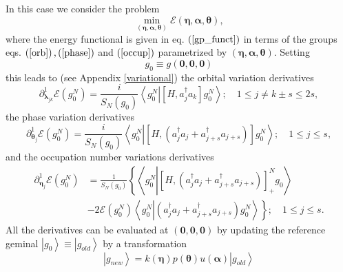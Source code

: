 \documentclass[titlepage]{article}%
\begin{document}
In this case we consider the problem
\begin{equation}
\min_{\left(  \bm{\eta,\alpha,\theta}\right)  }\mathcal{E}\left(
\bm{\eta,\alpha,\theta}\right)  ,
\end{equation}
where the energy functional is given in eq. $\left(  \ref{gp_funct}\right)  $
in terms of the groups eqs. $\left(  \ref{orb}\right)  ,\left(  \ref{phase}%
\right)  $ and $\left(  \ref{occup}\right)  $ parametrized by $\left(
\bm{\eta,\alpha,\theta}\right)  $. Setting
\begin{equation}
g_{0}\equiv g\left(  \bm{0,0,0}\right)
\end{equation}
this leads to (see Appendix \ref{variational}) the orbital variation
derivatives
\begin{equation}
\partial_{\bm{\lambda}_{jk}}^{1}\mathcal{E}\left(  g_{0}^{N}\right)  =\frac
{i}{S_{N}\left(  g_{0}\right)  }\left\langle g_{0}^{N}\left\vert \left[
H,a_{j}^{\dagger}a_{k}\right]  g_{0}^{N}\right.  \right\rangle ;\quad1\leq
j\neq k\pm s\leq2s,
\end{equation}
the phase variation derivatives
\begin{equation}
\partial_{\bm{\theta}_{j}}^{1}\mathcal{E}\left(  g_{0}^{N}\right)  =\frac
{i}{S_{N}\left(  g_{0}\right)  }\left\langle g_{0}^{N}\left\vert \left[
H,\left(  a_{j}^{\dagger}a_{j}+a_{j+s}^{\dagger}a_{j+s}\right)  \right]
g_{0}^{N}\right.  \right\rangle ;\quad1\leq j\leq s,
\end{equation}
and the occupation number variations derivatives
\begin{align}
\partial_{\bm{\eta}_{j}}^{1}\mathcal{E}\left(  g_{0}^{N}\right)   &  =\frac
{1}{S_{N}\left(  g_{0}\right)  }\left\{  \left\langle g_{0}^{N}\left\vert
\left[  H,\left(  a_{j}^{\dagger}a_{j}+a_{j+s}^{\dagger}a_{j+s}\right)
\right]  _{+}^{N}g_{0}\right.  \right\rangle \right. \nonumber\\
&  -\left.  2\mathcal{E}\left(  g_{0}^{N}\right)  \left\langle g_{0}%
^{N}\left\vert \left(  a_{j}^{\dagger}a_{j}+a_{j+s}^{\dagger}a_{j+s}\right)
g_{0}^{N}\right.  \right\rangle \right\}  ;\quad1\leq j\leq s.
\end{align}
All the derivatives can be evaluated at $\left(  \bm{0},\bm{0},\bm{0}\right)
$ by updating the reference geminal $\left\vert g_{0}\right\rangle
\equiv\left\vert g_{old}\right\rangle $ by a transformation
\begin{equation}
\left\vert g_{new}\right\rangle =k\left(  \bm{\eta}\right)  p\left(
\bm{\theta}\right)  u\left(  \bm{\alpha}\right)  \left\vert g_{old}%
\right\rangle
\end{equation}
\end{document}
